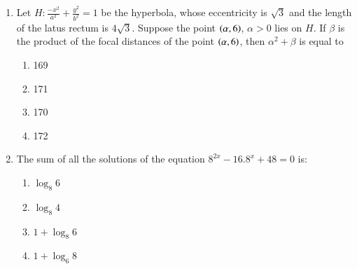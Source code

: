 \documentclass[journal]{IEEEtran}
\begin{document}
\begin{enumerate}
\item Let $H:\frac{-x^2}{a^2} + \frac{y^2}{b^2} = 1$ be the hyperbola, whose eccentricity is $\sqrt{3}$ and the length of the latus rectum is $4\sqrt{3}$. Suppose the point $\left(\alpha,6\right)$, $\alpha>0$ lies on $H$. If $\beta$ is the product of the focal distances of the point $\left(\alpha,6\right)$, then $\alpha^2 + \beta$ is equal to
\begin{multicols}{2}
    \begin{enumerate}
        \item 169
        \item 171
        \item 170
        \item 172
    \end{enumerate}
\end{multicols}

\item The sum of all the solutions of the equation $8^{2x} - 16 . 8^x + 48 = 0$ is:
\begin{multicols}{2}
    \begin{enumerate}
        \item $\log_8 {6}$
        \item $\log_8 {4}$
        \item $1+\log_8 {6}$
        \item $1+\log_6 {8}$
    \end{enumerate}
\end{multicols}
\end{enumerate}
\end{document}
